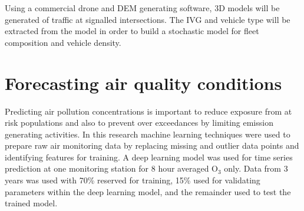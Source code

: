Using a commercial drone and DEM generating software, 3D models will be generated of traffic at signalled intersections. The IVG and vehicle type will be extracted from the model in order to build a stochastic model for fleet composition and vehicle density. 

\section{Forecasting air quality conditions}

Predicting air pollution concentrations is important to reduce exposure from at risk populations and also to prevent over exceedances by limiting emission generating activities. In this research machine learning techniques were used to prepare raw air monitoring data by replacing missing and outlier data points and identifying features for training. A deep learning model was used for time series prediction at one monitoring station for 8 hour averaged O$_{3}$ only.  Data from 3 years was used with 70\% reserved for training, 15\% used for validating parameters within the deep learning model, and the remainder used to test the trained model.

